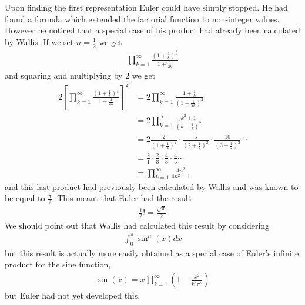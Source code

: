 Upon finding the first representation Euler could have simply stopped. He had found a formula which extended the factorial function to non-integer values. However he noticed that a special case of his product had already been calculated by Wallis. If we set $ n = \frac{1}{2} $ we get
\begin{align}
    \prod_{k=1}^\infty \frac{(1 + \frac{1}{k})^\frac{1}{2}}{1 + \frac{1}{2k}}
\end{align}
and squaring and multiplying by $ 2 $ we get
\begin{align}
    2 \left[ \prod_{k=1}^\infty \frac{(1 + \frac{1}{k})^\frac{1}{2}}{1 + \frac{1}{2k}}\right]^2 &= 2\prod_{k=1}^\infty \frac{1+\frac{1}{k}}{(1+\frac{1}{2k})^2} \\
    &= 2 \prod^\infty_{k=1} \frac{k^2+1}{(k + \frac{1}{2})^2} \\
    &= 2 \frac{2}{(1+\frac{1}{2})^2} \cdot \frac{5}{(2 + \frac{1}{2})^2} \cdot \frac{10}{(3+\frac{1}{2})^2}\cdots \\
    &= \frac{2}{1}\cdot\frac{2}{3}\cdot\frac{4}{3}\cdot\frac{4}{5}\cdots \\
    &= \prod_{k=1}^{\infty} \frac{4n^2}{4n^2-1}
\end{align}
and this last product had previously been calculated by Wallis and was known to be equal to $ \frac{\pi}{2} $. This meant that Euler had the result 
\begin{align}
    \frac{1}{2} ! = \frac{\sqrt{\pi}}{2}
\end{align}
We should point out that Wallis had calculated this result by considering 
\begin{align}
    \int_0^\pi \sin^n(x) dx
\end{align}
but this result is actually more easily obtained as a special case of Euler's infinite product for the sine function,
\begin{align}
    \sin(x) = x\prod_{k=1}^\infty \left( 1 - \frac{x^2}{k^2\pi^2} \right)
\end{align}
but Euler had not yet developed this.

